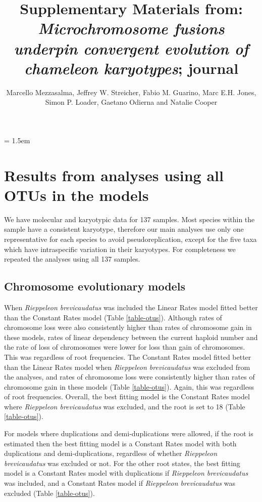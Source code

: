 \documentclass[a4paper, 12pt]{article}
\title{Supplementary Materials from: \textit{Microchromosome fusions underpin convergent evolution of chameleon karyotypes}; journal}
\author{Marcello Mezzasalma, Jeffrey W. Streicher, Fabio M. Guarino, Marc E.H. Jones,\\ 
Simon P. Loader, Gaetano Odierna and Natalie Cooper}
\date{}
\begin{document}
\maketitle

\tableofcontents

\parindent = 1.5em
\addtolength{\parskip}{.3em}

\newpage
\section{Results from analyses using all OTUs in the models}

We have molecular and karyotypic data for 137 samples. Most species within the sample have a consistent karyotype, therefore our main analyses use only one representative for each species to avoid pseudoreplication, except for the five taxa which have intraspecific variation in their karyotypes. For completeness we repeated the analyses using all 137 samples.

\subsection{Chromosome evolutionary models}
When \textit{Rieppeleon brevicaudatus} was included the Linear Rates model fitted better than the Constant Rates model (Table \ref{table-otus}). Although rates of chromosome loss were also consistently higher than rates of chromosome gain in these models, rates of linear dependency between the current haploid number and the rate of loss of chromosomes were lower for loss than gain of chromosomes. This was regardless of root frequencies. The Constant Rates model fitted better than the Linear Rates model when \textit{Rieppeleon brevicaudatus} was excluded from the analyses, and rates of chromosome loss were consistently higher than rates of chromosome gain in these models (Table \ref{table-otus}). Again, this was regardless of root frequencies. Overall, the best fitting model is the Constant Rates model where \textit{Rieppeleon brevicaudatus} was excluded, and the root is set to 18 (Table \ref{table-otus}). 

\noindent For models where duplications and demi-duplications were allowed, if the root is estimated then the best fitting model is a Constant Rates model with both duplications and demi-duplications, regardless of whether \textit{Rieppeleon brevicaudatus} was excluded or not. For the other root states, the best fitting model is a Constant Rates model with duplications if \textit{Rieppeleon brevicaudatus} was included, and a Constant Rates model if \textit{Rieppeleon brevicaudatus} was excluded (Table \ref{table-otus}). 
\end{document}
